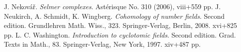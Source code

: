 \therefsection

\begin{thebibliography}{XXXX}
J. Nekov\'{a}\v{r}.
\emph{Selmer complexes}.
Ast\'erisque No. 310 (2006), viii+559 pp.
J. Neukirch, A. Schmidt, K. Wingberg.
\emph{Cohomology of number fields}.
Second edition.
Grundlehren Math. Wiss., 323.
Springer-Verlag, Berlin, 2008. xvi+825 pp.
L. C. Washington.
\emph{Introduction to cyclotomic fields}.
Second edition.
Grad. Texts in Math., 83.
Springer-Verlag, New York, 1997. xiv+487 pp.
\end{thebibliography}

